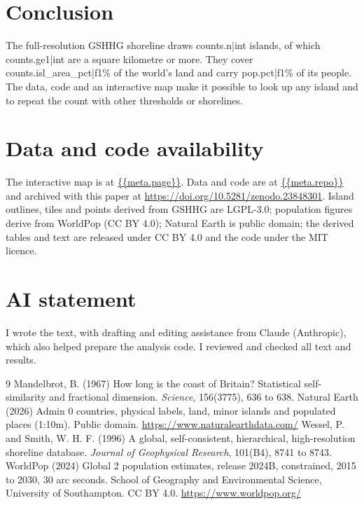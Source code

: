 \documentclass[11pt,a4paper]{article}
\begin{document}
\section{Conclusion}
The full-resolution GSHHG shoreline draws {{counts.n|int}} islands, of which {{counts.ge1|int}} are a square kilometre or more. They cover {{counts.isl_area_pct|f1}}\% of the world's land and carry {{pop.pct|f1}}\% of its people. The data, code and an interactive map make it possible to look up any island and to repeat the count with other thresholds or shorelines.

\section*{Data and code availability}
The interactive map is at \url{{{meta.page}}}. Data and code are at \url{{{meta.repo}}} and archived with this paper at \url{https://doi.org/10.5281/zenodo.23848301}. Island outlines, tiles and points derived from GSHHG are LGPL-3.0; population figures derive from WorldPop (CC BY 4.0); Natural Earth is public domain; the derived tables and text are released under CC BY 4.0 and the code under the MIT licence.

\section*{AI statement}
I wrote the text, with drafting and editing assistance from Claude (Anthropic), which also helped prepare the analysis code. I reviewed and checked all text and results.

\begin{thebibliography}{9}
 Mandelbrot, B. (1967) How long is the coast of Britain? Statistical self-similarity and fractional dimension. \emph{Science}, 156(3775), 636 to 638.
 Natural Earth (2026) Admin 0 countries, physical labels, land, minor islands and populated places (1:10m). Public domain. \url{https://www.naturalearthdata.com/}
 Wessel, P. and Smith, W. H. F. (1996) A global, self-consistent, hierarchical, high-resolution shoreline database. \emph{Journal of Geophysical Research}, 101(B4), 8741 to 8743.
 WorldPop (2024) Global 2 population estimates, release 2024B, constrained, 2015 to 2030, 30 arc seconds. School of Geography and Environmental Science, University of Southampton. CC BY 4.0. \url{https://www.worldpop.org/}
\end{thebibliography}
\end{document}
